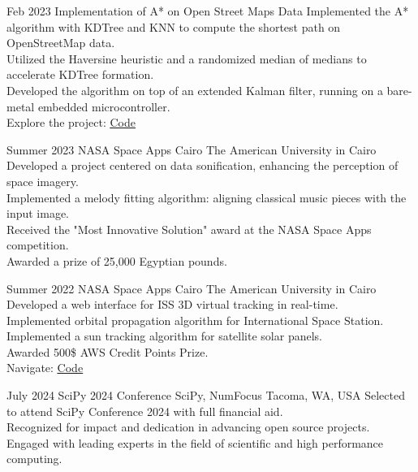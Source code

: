 \documentclass[hidelinks]{report}
\begin{document}
\entry
    {Feb 2023}
    {Implementation of A* on Open Street Maps Data }
    {} {}    
    {
       \textbullet Implemented the A* algorithm with KDTree and KNN to compute the shortest path on OpenStreetMap data.\\
       \textbullet Utilized the Haversine heuristic and a randomized median of medians to accelerate KDTree formation. \\
       \textbullet Developed the algorithm on top of an extended Kalman filter, running on a bare-metal embedded microcontroller.\\
       \textbullet Explore the project: \href{\github/Astar-OSM}{\underline{Code}}
    }

\vspace{4mm}


\entry
    {Summer 2023}
    {NASA Space Apps Cairo}
    {The American University in Cairo }    
    {}
    {
      \textbullet Developed a project centered on data sonification, enhancing the perception of space imagery.\\
      \textbullet Implemented a melody fitting algorithm: aligning classical music pieces with the input image.\\
      \textbullet Received the "Most Innovative Solution" award at the NASA Space Apps competition.\\
      \textbullet Awarded a prize of 25,000 Egyptian pounds.\\
    }
    
\entry 
    {Summer 2022}
    {NASA Space Apps Cairo}
    {The American University in Cairo }
    {}
    { \textbullet Developed a web interface for ISS 3D virtual tracking in real-time. \\
      \textbullet Implemented orbital propagation algorithm for International Space Station.\\ 
      \textbullet Implemented a sun tracking algorithm for satellite solar panels.\\
      \textbullet Awarded 500\$ AWS Credit Points Prize.\\ 
      \textbullet Navigate: \href{\github/Apollo}{\underline{Code}}
    }

\vspace{2mm}
\newpage


\entry
    {July 2024}
    {SciPy 2024 Conference}  
    {SciPy, NumFocus}
    {Tacoma, WA, USA}
    {
        \textbullet Selected to attend SciPy Conference 2024 with full financial aid.\\
        \textbullet Recognized for impact and dedication in advancing open source projects.\\
        \textbullet Engaged with leading experts in the field of scientific and high performance computing.\\
    }
\end{document}
